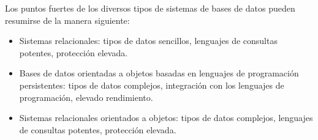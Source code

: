 \documentclass[preprint,12pt]{elsarticle}
\begin{document}
Los puntos fuertes de los diversos tipos de sistemas de bases de datos pueden resumirse de la manera siguiente:
\begin{itemize}
	\item Sistemas relacionales: tipos de datos sencillos, lenguajes de consultas potentes, protección elevada.
	\item Bases de datos orientadas a objetos basadas en lenguajes de programación persistentes: tipos de datos complejos, integración con los lenguajes de programación, elevado rendimiento.
	\item Sistemas relacionales orientados a objetos: tipos de datos complejos, lenguajes de consultas potentes, protección elevada.
\end{itemize}

\cite{SilberschatzKorthSudarshan2006}
\end{document}
